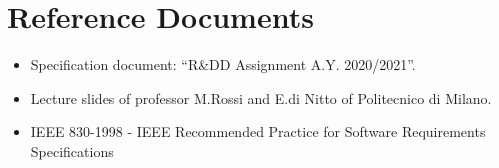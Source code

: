 \section{Reference Documents}

\begin{itemize}
	\item Specification document: “R\&DD Assignment A.Y. 2020/2021”.
	\item Lecture slides of professor M.Rossi and E.di Nitto of Politecnico di Milano.
	\item IEEE 830-1998 - IEEE Recommended Practice for Software Requirements Specifications
\end{itemize}